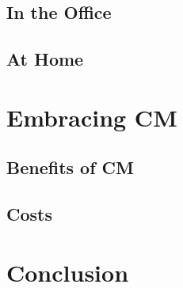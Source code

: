 \documentclass[cmpstyle]{ueacmpstyle}
\begin{document}
		\subsection{In the Office} \label{sec:office}
		
		\subsection{At Home} \label{sec:home}
		
	\section{Embracing CM} \label{sec:embracing}
	
		\subsection{Benefits of CM} \label{sec:benefits}
		
		\subsection{Costs} \label{sec:costs}
		
	\section{Conclusion} \label{sec:conc}
	
	
	
\end{document}
